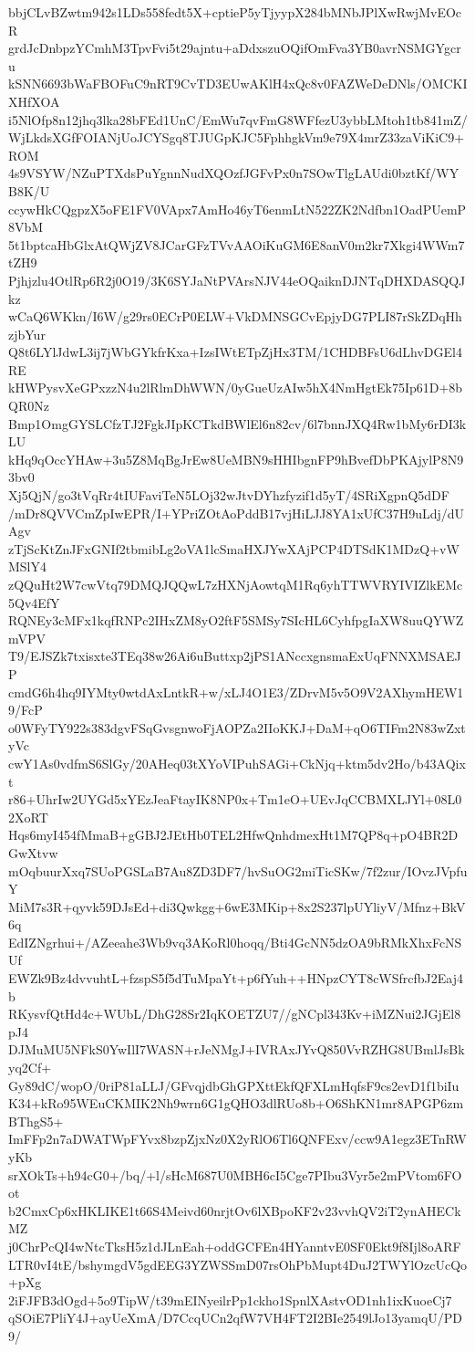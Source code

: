 bbjCLvBZwtm942s1LDs558fedt5X+cptieP5yTjyypX284bMNbJPlXwRwjMvEOcR
grdJcDnbpzYCmhM3TpvFvi5t29ajntu+aDdxszuOQifOmFva3YB0avrNSMGYgcru
kSNN6693bWaFBOFuC9nRT9CvTD3EUwAKlH4xQc8v0FAZWeDeDNls/OMCKIXHfXOA
i5NlOfp8n12jhq3lka28bFEd1UnC/EmWu7qvFmG8WFfezU3ybbLMtoh1tb841mZ/
WjLkdsXGfFOIANjUoJCYSgq8TJUGpKJC5FphhgkVm9e79X4mrZ33zaViKiC9+ROM
4s9VSYW/NZuPTXdsPuYgnnNudXQOzfJGFvPx0n7SOwTlgLAUdi0bztKf/WYB8K/U
ccywHkCQgpzX5oFE1FV0VApx7AmHo46yT6enmLtN522ZK2Ndfbn1OadPUemP8VbM
5t1bptcaHbGlxAtQWjZV8JCarGFzTVvAAOiKuGM6E8anV0m2kr7Xkgi4WWm7tZH9
Pjhjzlu4OtlRp6R2j0O19/3K6SYJaNtPVArsNJV44eOQaiknDJNTqDHXDASQQJkz
wCaQ6WKkn/I6W/g29rs0ECrP0ELW+VkDMNSGCvEpjyDG7PLI87rSkZDqHhzjbYur
Q8t6LYlJdwL3ij7jWbGYkfrKxa+IzsIWtETpZjHx3TM/1CHDBFsU6dLhvDGEl4RE
kHWPysvXeGPxzzN4u2lRlmDhWWN/0yGueUzAIw5hX4NmHgtEk75Ip61D+8bQR0Nz
Bmp1OmgGYSLCfzTJ2FgkJIpKCTkdBWlEl6n82cv/6l7bnnJXQ4Rw1bMy6rDI3kLU
kHq9qOccYHAw+3u5Z8MqBgJrEw8UeMBN9sHHIbgnFP9hBvefDbPKAjylP8N93bv0
Xj5QjN/go3tVqRr4tIUFaviTeN5LOj32wJtvDYhzfyzif1d5yT/4SRiXgpnQ5dDF
/mDr8QVVCmZpIwEPR/I+YPriZOtAoPddB17vjHiLJJ8YA1xUfC37H9uLdj/dUAgv
zTjScKtZnJFxGNIf2tbmibLg2oVA1lcSmaHXJYwXAjPCP4DTSdK1MDzQ+vWMSlY4
zQQuHt2W7cwVtq79DMQJQQwL7zHXNjAowtqM1Rq6yhTTWVRYIVIZlkEMc5Qv4EfY
RQNEy3cMFx1kqfRNPc2IHxZM8yO2ftF5SMSy7SIcHL6CyhfpgIaXW8uuQYWZmVPV
T9/EJSZk7txisxte3TEq38w26Ai6uButtxp2jPS1ANccxgnsmaExUqFNNXMSAEJP
cmdG6h4hq9IYMty0wtdAxLntkR+w/xLJ4O1E3/ZDrvM5v5O9V2AXhymHEW19/FcP
o0WFyTY922s383dgvFSqGvsgnwoFjAOPZa2IIoKKJ+DaM+qO6TIFm2N83wZxtyVc
cwY1As0vdfmS6SlGy/20AHeq03tXYoVIPuhSAGi+CkNjq+ktm5dv2Ho/b43AQixt
r86+UhrIw2UYGd5xYEzJeaFtayIK8NP0x+Tm1eO+UEvJqCCBMXLJYl+08L02XoRT
Hqs6myI454fMmaB+gGBJ2JEtHb0TEL2HfwQnhdmexHt1M7QP8q+pO4BR2DGwXtvw
mOqbuurXxq7SUoPGSLaB7Au8ZD3DF7/hvSuOG2miTicSKw/7f2zur/IOvzJVpfuY
MiM7s3R+qyvk59DJsEd+di3Qwkgg+6wE3MKip+8x2S237lpUYliyV/Mfnz+BkV6q
EdIZNgrhui+/AZeeahe3Wb9vq3AKoRl0hoqq/Bti4GcNN5dzOA9bRMkXhxFcNSUf
EWZk9Bz4dvvuhtL+fzspS5f5dTuMpaYt+p6fYuh++HNpzCYT8cWSfrcfbJ2Eaj4b
RKysvfQtHd4c+WUbL/DhG28Sr2IqKOETZU7//gNCpl343Kv+iMZNui2JGjEl8pJ4
DJMuMU5NFkS0YwIlI7WASN+rJeNMgJ+IVRAxJYvQ850VvRZHG8UBmlJsBkyq2Cf+
Gy89dC/wopO/0riP81aLLJ/GFvqjdbGhGPXttEkfQFXLmHqfsF9cs2evD1f1biIu
K34+kRo95WEuCKMIK2Nh9wrn6G1gQHO3dlRUo8b+O6ShKN1mr8APGP6zmBThgS5+
ImFFp2n7aDWATWpFYvx8bzpZjxNz0X2yRlO6Tl6QNFExv/ccw9A1egz3ETnRWyKb
srXOkTs+h94cG0+/bq/+l/sHcM687U0MBH6cI5Cge7PIbu3Vyr5e2mPVtom6FOot
b2CmxCp6xHKLIKE1t66S4Meivd60nrjtOv6lXBpoKF2v23vvhQV2iT2ynAHECkMZ
j0ChrPcQI4wNtcTksH5z1dJLnEah+oddGCFEn4HYanntvE0SF0Ekt9f8Ijl8oARF
LTR0vI4tE/bshymgdV5gdEEG3YZWSSmD07rsOhPbMupt4DuJ2TWYlOzcUcQo+pXg
2iFJFB3dOgd+5o9TipW/t39mEINyeilrPp1ckho1SpnlXAstvOD1nh1ixKuoeCj7
qSOiE7PliY4J+ayUeXmA/D7CcqUCn2qfW7VH4FT2I2BIe2549lJo13yamqU/PD9/
